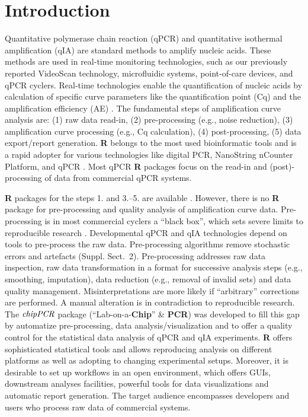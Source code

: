 \documentclass{bioinfo}
\begin{document}
\section{Introduction}

Quantitative polymerase chain reaction (qPCR) and quantitative isothermal 
amplification (qIA) are standard methods to amplify nucleic acids. These methods 
are used in real-time monitoring technologies, such as our previously reported 
VideoScan technology, microfluidic systems, point-of-care devices, and qPCR 
cyclers. Real-time technologies enable the quantification of nucleic acids by 
calculation of specific curve parameters like the quantification point (Cq) and 
the amplification efficiency (AE) 
\citep{roediger_highly_2013,rodiger_nucleic_2014,pabinger_2014}. The fundamental 
steps of amplification curve analysis are: (1) raw data read-in, (2) 
pre-processing (e.g., noise reduction), (3) amplification curve processing 
(e.g., Cq calculation), (4) post-processing, (5) data 
export/report generation. \textbf{R} belongs to the most used bioinformatic	
tools and is a rapid adopter for various technologies like digital PCR, 
NanoString nCounter Platform, and qPCR \citep{waggott_2012,pabinger_2014}. Most 
qPCR \textbf{R} packages focus on the read-in and (post)-processing of data from 
commercial qPCR systems.

\textbf{R} packages for the steps 1. and 3.--5. are 
available \citep{pabinger_2014,perkins_2012,mccall_2014,gehlenborg_2013}.
However, there is no \textbf{R} package for pre-processing and quality analysis 
of amplification curve data. Pre-processing is in most commercial cyclers a 
``black box'', which sets severe limits to reproducible research 
\citep{Leeper_2014}. Developmental qPCR and qIA technologies depend on tools to 
pre-process the raw data. Pre-processing algorithms remove stochastic errors and 
artefacts (Suppl. Sect.~2). Pre-processing addresses raw data %
inspection, raw data transformation in a format for successive analysis steps 
(e.g., smoothing, imputation), data reduction (e.g., removal of invalid sets) 
and data quality management. Misinterpretations are more likely if ``arbitrary'' 
corrections are performed. A manual alteration is in contradiction to 
reproducible research. The $\emph{chipPCR}$ package (``Lab-on-a-\textbf{Chip}'' 
\& \textbf{PCR}) was developed to fill this gap by automatize 
pre-processing, data analysis/visualization and to offer a quality control for 
the statistical data analysis of qPCR and qIA experiments. \textbf{R} offers 
sophisticated statistical tools and allows reproducing analysis on different 
platforms as well as adopting to changing experimental setups. Moreover, it is 
desirable to set up workflows in an open environment, which offers GUIs, downstream 
analyses facilities, powerful tools for data visualizations and automatic 
report generation. The target audience encompasses developers and users who 
process raw data of commercial systems.
\end{document}

